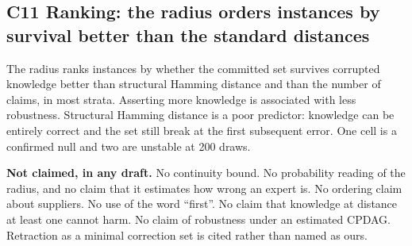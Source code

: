 \subsection*{C11 \quad Ranking: the radius orders instances by survival better than the standard distances}

The radius ranks instances by whether the committed set survives corrupted knowledge better than
structural Hamming distance and than the number of claims, in most strata. Asserting more knowledge
is associated with less robustness. Structural Hamming distance is a poor predictor: knowledge can
be entirely correct and the set still break at the first subsequent error. One cell is a confirmed
null and two are unstable at 200 draws.

\begin{verdict}
\textbf{Not claimed, in any draft.} No continuity bound. No probability reading of the radius, and
no claim that it estimates how wrong an expert is. No ordering claim about suppliers. No use of the
word ``first''. No claim that knowledge at distance at least one cannot harm. No claim of
robustness under an estimated CPDAG. Retraction as a minimal correction set is cited rather than
named as ours.
\end{verdict}
